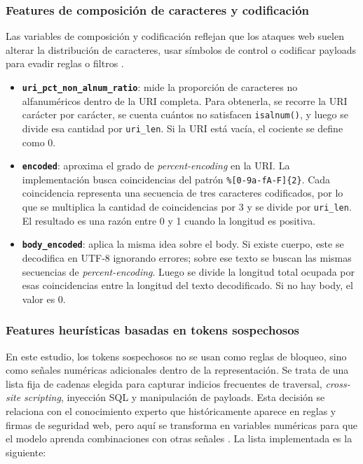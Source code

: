 \documentclass[12pt,oneside]{report}
\begin{document}
\subsubsection{Features de composición de caracteres y codificación}
Las variables de composición y codificación reflejan que los ataques web suelen alterar la distribución de caracteres, usar símbolos de control o codificar payloads para evadir reglas o filtros \cite{kruegel_vigna_2003,wang_stolfo_2004}.
\begin{itemize}[leftmargin=*]
  \item \textbf{\texttt{uri\_pct\_non\_alnum\_ratio}}: mide la proporción de caracteres no alfanuméricos dentro de la URI completa. Para obtenerla, se recorre la URI carácter por carácter, se cuenta cuántos no satisfacen \texttt{isalnum()}, y luego se divide esa cantidad por \texttt{uri\_len}. Si la URI está vacía, el cociente se define como 0.

  \item \textbf{\texttt{encoded}}: aproxima el grado de \textit{percent-encoding} en la URI. La implementación busca coincidencias del patrón \texttt{\%[0-9a-fA-F]\{2\}}. Cada coincidencia representa una secuencia de tres caracteres codificados, por lo que se multiplica la cantidad de coincidencias por 3 y se divide por \texttt{uri\_len}. El resultado es una razón entre 0 y 1 cuando la longitud es positiva.

  \item \textbf{\texttt{body\_encoded}}: aplica la misma idea sobre el body. Si existe cuerpo, este se decodifica en UTF-8 ignorando errores; sobre ese texto se buscan las mismas secuencias de \textit{percent-encoding}. Luego se divide la longitud total ocupada por esas coincidencias entre la longitud del texto decodificado. Si no hay body, el valor es 0.
\end{itemize}

\subsubsection{Features heurísticas basadas en tokens sospechosos}
En este estudio, los tokens sospechosos no se usan como reglas de bloqueo, sino como señales numéricas adicionales dentro de la representación. Se trata de una lista fija de cadenas elegida para capturar indicios frecuentes de traversal, \textit{cross-site scripting}, inyección SQL y manipulación de payloads. Esta decisión se relaciona con el conocimiento experto que históricamente aparece en reglas y firmas de seguridad web, pero aquí se transforma en variables numéricas para que el modelo aprenda combinaciones con otras señales \cite{owasp_waf,modsecurity_site,riverol_2024}. La lista implementada es la siguiente:
\end{document}
